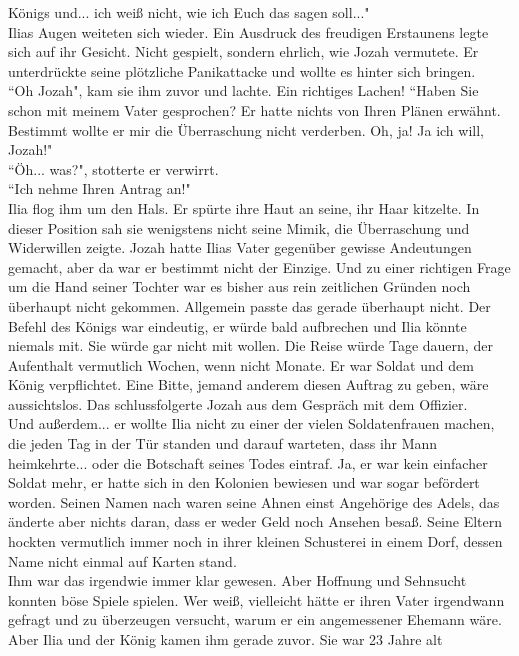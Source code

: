 Königs und... ich weiß nicht, wie ich Euch das sagen soll..."\\
Ilias Augen weiteten sich wieder. Ein Ausdruck des freudigen Erstaunens legte sich auf ihr Gesicht. 
Nicht gespielt, sondern ehrlich, wie Jozah vermutete. Er unterdrückte seine plötzliche Panikattacke 
und wollte es hinter sich bringen.\\
 ``Oh Jozah", kam sie ihm zuvor und lachte. Ein richtiges Lachen!  ``Haben Sie schon mit meinem 
Vater gesprochen? Er hatte nichts von Ihren Plänen erwähnt. Bestimmt wollte er mir die Überraschung 
nicht verderben. Oh, ja! Ja ich will, Jozah!"\\
 ``Öh... was?", stotterte er verwirrt.\\
 ``Ich nehme Ihren Antrag an!"\\
Ilia flog ihm um den Hals. Er spürte ihre Haut an seine, ihr Haar kitzelte. In dieser Position sah 
sie wenigstens nicht seine Mimik, die Überraschung und Widerwillen zeigte. Jozah hatte Ilias Vater 
gegenüber gewisse Andeutungen gemacht, aber da war er bestimmt nicht der Einzige. Und zu einer 
richtigen Frage um die Hand seiner Tochter war es bisher aus rein zeitlichen Gründen noch überhaupt 
nicht gekommen. Allgemein passte das gerade überhaupt nicht. Der Befehl des Königs war eindeutig, 
er würde bald aufbrechen und Ilia könnte niemals mit. Sie würde gar nicht mit wollen. Die Reise 
würde Tage dauern, der Aufenthalt vermutlich Wochen, wenn nicht Monate. Er war Soldat und dem König 
verpflichtet. Eine Bitte, jemand anderem diesen Auftrag zu geben, wäre aussichtslos. Das 
schlussfolgerte Jozah aus dem Gespräch mit dem Offizier. \\
Und außerdem... er wollte Ilia nicht zu einer der vielen Soldatenfrauen machen, die jeden Tag in 
der Tür standen und darauf warteten, dass ihr Mann heimkehrte... oder die Botschaft seines Todes 
eintraf. Ja, er war kein einfacher Soldat mehr, er hatte sich in den Kolonien bewiesen und war 
sogar befördert worden. Seinen Namen nach waren seine Ahnen einst Angehörige des Adels, das änderte 
aber nichts daran, dass er weder Geld noch Ansehen besaß. Seine Eltern hockten vermutlich immer 
noch in ihrer kleinen Schusterei in einem Dorf, dessen Name nicht einmal auf Karten stand.\\
Ihm war das irgendwie immer klar gewesen. Aber Hoffnung und Sehnsucht konnten böse Spiele spielen. 
Wer weiß, vielleicht hätte er ihren Vater irgendwann gefragt und zu überzeugen versucht, warum er 
ein angemessener Ehemann wäre. Aber Ilia und der König kamen ihm gerade zuvor. Sie war 23 Jahre alt 
